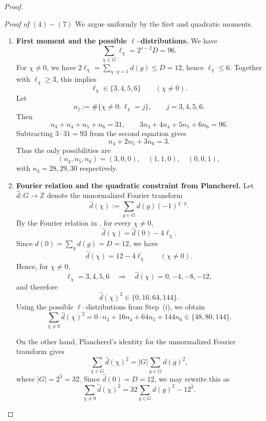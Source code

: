 \documentclass[12pt,twoside,]{amsart}
\theoremstyle{plain}
\theoremstyle{definition}
\begin{document}
\begin{proof}
\begin{enumerate}
\end{enumerate}



\noindent\textit{Proof of $(4)-(7)$} We argue uniformly by the first and quadratic moments.

\begin{enumerate}
\item[(i)] \textbf{First moment and the possible $\ell$--distributions.}
We have
\[
\sum_{\chi\in G}\ell_\chi = 2^{s-2}D = 96.
\]
For $\chi\neq 0$, we have $2\ell_\chi=\sum_{\chi\cdot g=1} d(g)\le D=12$, hence
$\ell_\chi\le 6$. Together with $\ell_\chi\ge 3$, this implies
\[
\ell_\chi\in\{3,4,5,6\}\qquad(\chi\neq 0).
\]
Let
\[
n_j:=\#\{\chi\neq 0:\ell_\chi=j\},\qquad j=3,4,5,6.
\]
Then
\[
n_3+n_4+n_5+n_6=31,
\qquad
3n_3+4n_4+5n_5+6n_6=96.
\]
Subtracting $3\cdot 31=93$ from the second equation gives
\[
n_4+2n_5+3n_6=3.
\]
Thus the only possibilities are
\[
(n_4,n_5,n_6)=(3,0,0),\quad (1,1,0),\quad (0,0,1),
\]
with $n_3=28,29,30$ respectively.

\item[(ii)] \textbf{Fourier relation and the quadratic constraint from Plancherel.}
Let $\widehat d:G\to\mathbb Z$ denote the unnormalized Fourier transform
\[
\widehat d(\chi):=\sum_{g\in G} d(g)(-1)^{\chi\cdot g}.
\]
By the Fourier relation in , for every $\chi\neq 0$,
\[
\widehat d(\chi)=\widehat d(0)-4\ell_\chi.
\]
Since $\widehat d(0)=\sum_g d(g)=D=12$, we have
\[
\widehat d(\chi)=12-4\ell_\chi
\qquad (\chi\neq 0).
\]
Hence, for $\chi\neq 0$,
\[
\ell_\chi=3,4,5,6 \quad\Longrightarrow\quad
\widehat d(\chi)=0,-4,-8,-12,
\]
and therefore
\[
\widehat d(\chi)^2\in\{0,16,64,144\}.
\]
Using the possible $\ell$--distributions from Step~(i), we obtain
\[
\sum_{\chi\neq 0}\widehat d(\chi)^2
=
0\cdot n_3 + 16n_4 + 64n_5 + 144n_6
\in\{48,80,144\}.
\]

On the other hand, Plancherel's identity for the unnormalized Fourier transform gives
\[
\sum_{\chi\in G}\widehat d(\chi)^2
=
|G|\sum_{g\in G} d(g)^2,
\]
where $|G|=2^5=32$. Since $\widehat d(0)=D=12$, we may rewrite this as
\begin{equation}\label{eq:nontriv-energy}
\sum_{\chi\neq 0}\widehat d(\chi)^2
=
32\sum_{g\in G} d(g)^2 - 12^2.
\end{equation}


\end{enumerate}
\end{proof}
\end{document}
